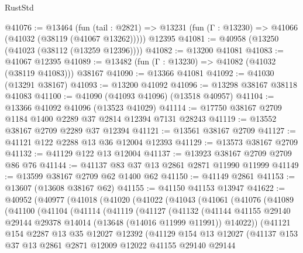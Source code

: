 \begin{lexlean}{RustStd}
\begin{coremodule}
@41076 := @13464
    (fun (tail : @2821) => @13231 (fun (Γ : @13230) => @41066 (@41032 (@38119 (@41067 @13262)))))
    @12395
@41081 := @40958 (@13250 (@41023 (@38112 (@13259 @12396))))
@41082 := @13200 @41081
@41083 := @41067 @12395
@41089 := @13482 (fun (Γ : @13230) => @41082 (@41032 (@38119 @41083))) @38167
@41090 := @13366 @41081
@41092 := @41030 (@13291 @38167)
@41093 := @13200 @41092
@41096 := @13298 @38167 @38118 @41083
@41100 := @41090 (@41093 @41096) (@13518 @40957)
@41104 := @13366 @41092 @41096 (@13523 @41029)
@41114 := @17750 @38167 @2709 @1184 @1400 @2289 @37 @2814 @12394 @7131 @28243
@41119 := @13552 @38167 @2709 @2289 @37 @12394
@41121 := @13561 @38167 @2709
@41127 := @41121 @122 @2288 @13 @36 @12004 @12393
@41129 := @13573 @38167 @2709
@41132 := @41129 @122 @13 @12004
@41137 := @13923 @38167 @2709 @2709 @86 @76
@41144 := @41137 @83 @37 @13 @2861 @2871 @11990 @11999
@41149 := @13599 @38167 @2709 @62 @1400 @62
@41150 := @41149 @2861
@41153 := @13607 (@13608 @38167 @62)
@41155 := @41150 @41153 @13947
@41622 := @40952
    (@40977
      (@41018
        (@41020
          (@41022
            (@41043
              (@41061
                (@41076
                  (@41089
                    (@41100
                      (@41104
                        (@41114
                          (@41119
                            (@41127
                              (@41132
                                (@41144
                                  @41155
                                  @29140
                                  @29144
                                  @29378
                                  @14014
                                  (@13648 (@14016 @11999 @11991))
                                  @14022))
                              (@41121
                                @154
                                @2287
                                @13
                                @35
                                @12027
                                @12392
                                (@41129
                                  @154
                                  @13
                                  @12027
                                  (@41137
                                    @153
                                    @37
                                    @13
                                    @2861
                                    @2871
                                    @12009
                                    @12022
                                    @41155
                                    @29140
                                    @29144

\end{coremodule}
\end{lexlean}
